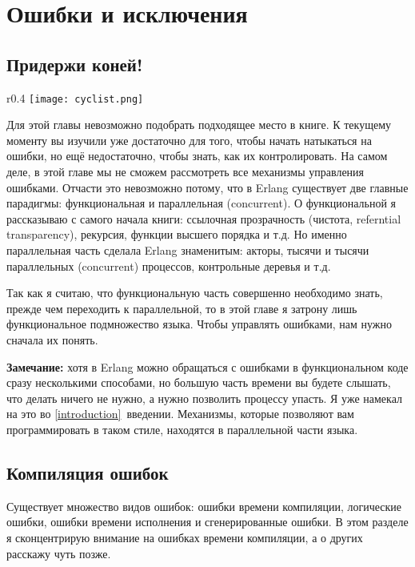\chapter{Ошибки и исключения}
\label{errors-and-exceptions}
\section{Придержи коней!}
\begin{wrapfigure}{r}{0.4\linewidth}
    \texttt{[image: cyclist.png]}
\end{wrapfigure}
Для этой главы невозможно подобрать подходящее место в книге. К текущему моменту вы изучили уже достаточно для того, чтобы начать натыкаться на ошибки, но ещё недостаточно, чтобы знать, как их контролировать. На самом деле, в этой главе мы не сможем рассмотреть все механизмы управления ошибками. Отчасти это невозможно потому, что в Erlang существует две главные парадигмы: функциональная и параллельная (concurrent). О функциональной я рассказываю с самого начала книги: ссылочная прозрачность (чистота, referntial transparency), рекурсия, функции высшего порядка и т.д. Но именно параллельная часть сделала Erlang знаменитым: акторы, тысячи и тысячи параллельных (concurrent) процессов, контрольные деревья и т.д.

Так как я считаю, что функциональную часть совершенно необходимо знать, прежде чем переходить к параллельной, то в этой главе я затрону лишь функциональное подмножество языка. Чтобы управлять ошибками, нам нужно сначала их понять.\\
\colorbox{lgray}
{
\begin{minipage}{1.0\linewidth}
    \textbf{Замечание:} хотя в Erlang можно обращаться с ошибками в функциональном коде сразу несколькими способами, но большую часть времени вы будете слышать, что делать ничего не нужно, а нужно позволить процессу упасть. Я уже намекал на это во \ref{introduction}~введении. Механизмы, которые позволяют вам программировать в таком стиле, находятся в параллельной части языка.
\end{minipage}
}
\section{Компиляция ошибок}
Существует множество видов ошибок: ошибки времени компиляции, логические ошибки, ошибки времени исполнения и сгенерированные ошибки. В этом разделе я сконцентрирую внимание на ошибках времени компиляции, а о других расскажу чуть позже.

